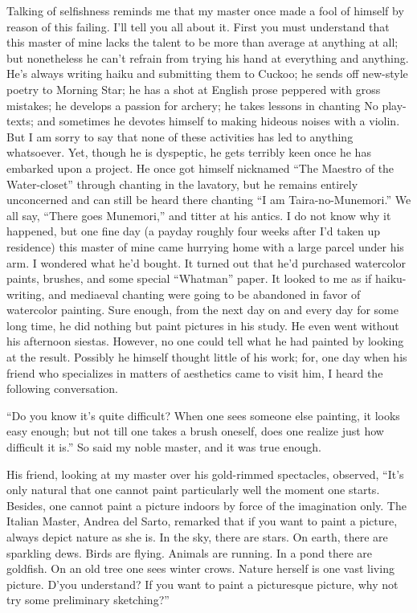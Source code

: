 \documentclass[12pt, openright]{book}
\begin{document}
Talking of selfishness reminds me that my master once made a fool of
himself by reason of this failing. I'll tell you all about it. First you
must understand that this master of mine lacks the talent to be more
than average at anything at all; but nonetheless he can't refrain from
trying his hand at everything and anything. He's always writing haiku
and submitting them to Cuckoo; he sends off new-style poetry to Morning
Star; he has a shot at English prose peppered with gross mistakes; he
develops a passion for archery; he takes lessons in chanting No
play-texts; and sometimes he devotes himself to making hideous noises
with a violin. But I am sorry to say that none of these activities has
led to anything whatsoever. Yet, though he is dyspeptic, he gets
terribly keen once he has embarked upon a project. He once got himself
nicknamed ``The Maestro of the Water-closet'' through chanting in the
lavatory, but he remains entirely unconcerned and can still be heard
there chanting ``I am Taira-no-Munemori.'' We all say, ``There goes
Munemori,'' and titter at his antics. I do not know why it happened, but
one fine day (a payday roughly four weeks after I'd taken up residence)
this master of mine came hurrying home with a large parcel under his
arm. I wondered what he'd bought. It turned out that he'd purchased
watercolor paints, brushes, and some special ``Whatman'' paper. It
looked to me as if haiku-writing, and mediaeval chanting were going to
be abandoned in favor of watercolor painting. Sure enough, from the next
day on and every day for some long time, he did nothing but paint
pictures in his study. He even went without his afternoon siestas.
However, no one could tell what he had painted by looking at the result.
Possibly he himself thought little of his work; for, one day when his
friend who specializes in matters of aesthetics came to visit him, I
heard the following conversation.

``Do you know it's quite difficult? When one sees someone else painting,
it looks easy enough; but not till one takes a brush oneself, does one
realize just how difficult it is.'' So said my noble master, and it was
true enough.

His friend, looking at my master over his gold-rimmed spectacles,
observed, ``It's only natural that one cannot paint particularly well
the moment one starts. Besides, one cannot paint a picture indoors by
force of the imagination only. The Italian Master, Andrea del Sarto,
remarked that if you want to paint a picture, always depict nature as
she is. In the sky, there are stars. On earth, there are sparkling dews.
Birds are flying. Animals are running. In a pond there are goldfish. On
an old tree one sees winter crows. Nature herself is one vast living
picture. D'you understand? If you want to paint a picturesque picture,
why not try some preliminary sketching?''
\end{document}
